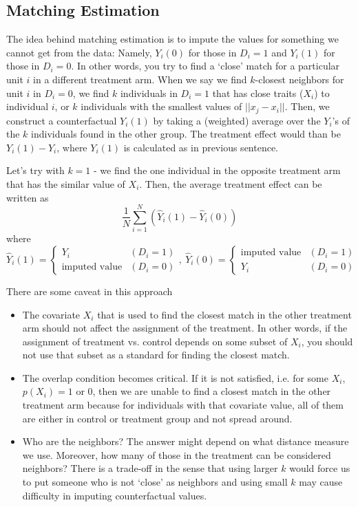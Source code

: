 \documentclass[12pt]{article}
\theoremstyle{definition}
\theoremstyle{property}
\theoremstyle{assumption}
\theoremstyle{example}
\theoremstyle{comment}
\begin{document}
\subsection{Matching Estimation}
The idea behind matching estimation is to impute the values for something we cannot get from the data: Namely,  $Y_i(0)$ for those in $D_i=1$ and $Y_i(1)$ for those in $D_i=0$. In other words, you try to find a `close' match for a particular unit $i$ in a different treatment arm. When we say we find $k$-closest neighbors for unit $i$ in $D_i=0$, we find $k$ individuals in $D_i=1$ that has close traits ($X_i$) to individual $i$, or $k$ individuals with the smallest values of $||x_j - x_i||$. Then, we construct a counterfactual $Y_i(1)$ by taking a (weighted) average over the $Y_i$'s of the $k$ individuals found in the other group. The treatment effect would than be $Y_i(1) -Y_i$, where $Y_i(1)$ is calculated as in previous sentence. \par
Let's try with $k=1$ - we find the one individual in the opposite treatment arm that has the similar value of $X_i$. Then, the average treatment effect can be written as
\[
\frac{1}{N}\sum_{i=1}^N(\hat{Y}_i(1)-\hat{Y}_i(0))
\]
where
\[
\hat{Y}_i(1)=\begin{cases} Y_i & (D_i=1) \\ \text{imputed value} & (D_i=0)\end{cases}, \ \hat{Y}_i(0)=\begin{cases} \text{imputed value} & (D_i=1) \\ Y_i & (D_i=0)\end{cases}
\]
\par
There are some caveat in this approach
\begin{itemize}
\item The covariate $X_i$ that is used to find the closest match in the other treatment arm should not affect the assignment of the treatment. In other words, if the assignment of treatment vs. control depends on some subset of $X_i$, you should not use that subset as a standard for finding the closest match.
\item The overlap condition becomes critical. If it is not satisfied, i.e. for some $X_i$, $p(X_i)=1$ or $0$, then we are unable to find a closest match in the other treatment arm because for individuals with that covariate value, all of them are either in control or treatment group and not spread around. 
\item Who are the neighbors? The answer might depend on what distance measure we use. Moreover, how many of those in the treatment can be considered neighbors? There is a trade-off in the sense that using larger $k$ would force us to put someone who is not `close' as neighbors and using small $k$ may cause difficulty in imputing counterfactual values. 
\end{itemize}
\end{document}

